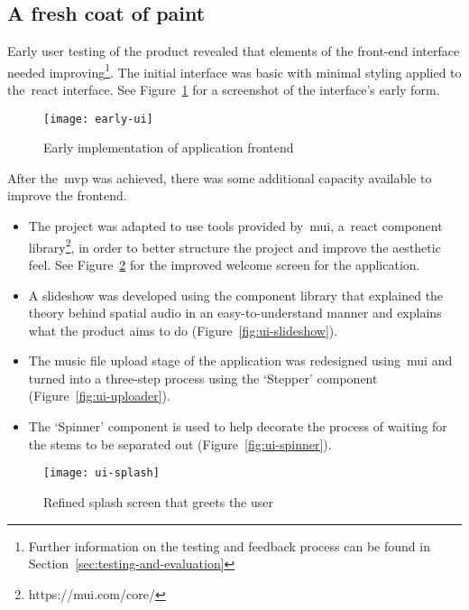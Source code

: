 \subsection{A fresh coat of paint}\label{subsec:a-fresh-coat-of-paint}

Early user testing of the product revealed
that elements of the front-end interface needed improving\footnote{Further information on the testing and feedback process can be found in Section~\ref{sec:testing-and-evaluation}}.
The initial interface was basic with minimal styling applied to the~\gls{react} interface.
See Figure~\ref{fig:early-fe} for a screenshot of the interface's early form.

\begin{figure}[!htb]
    \minipage{\textwidth}
    \texttt{[image: early-ui]}
    \caption{Early implementation of application frontend}\label{fig:early-fe}
    \endminipage\hfill
\end{figure}

After the~\gls{mvp} was achieved, there was some additional capacity available to improve the frontend.

\begin{itemize}
    \item The project was adapted to use tools provided by~\gls{mui},
    a~\gls{react} component library\footnote{https://mui.com/core/},
    in order to better structure the project and improve the aesthetic feel.
    See Figure~\ref{fig:ui-splash} for the improved welcome screen for the application.
    \item A slideshow was developed using the component library that explained the theory behind spatial audio in an easy-to-understand manner and explains what the product aims to do (Figure~\ref{fig:ui-slideshow}).
    \item The music file upload stage of the application was redesigned using~\gls{mui} and turned into a three-step process using the `Stepper' component (Figure~\ref{fig:ui-uploader}).
    \item The `Spinner' component is used to help decorate the process of waiting for the stems to be separated out (Figure~\ref{fig:ui-spinner}).
\end{itemize}

\begin{figure}[!htb]
    \minipage{\textwidth}
    \texttt{[image: ui-splash]}
    \caption{Refined splash screen that greets the user}\label{fig:ui-splash}
    \endminipage\hfill
\end{figure}

